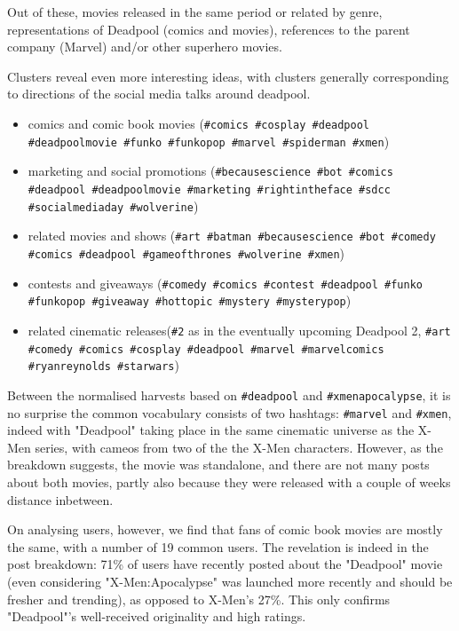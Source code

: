 \documentclass[12pt,a4paper,twoside]{report}
\begin{document}
Out of these, movies released in the same period or related by genre, representations of Deadpool (comics and movies), references to the parent company (Marvel) and/or other superhero movies.

Clusters reveal even more interesting ideas, with clusters generally corresponding to directions of the social media talks around deadpool.

\begin{itemize}
\item comics and comic book movies (\texttt{\#comics \#cosplay \#deadpool \#deadpoolmovie \#funko \#funkopop \#marvel \#spiderman \#xmen})
\item marketing and social promotions (\texttt{\#becausescience \#bot \#comics \#deadpool \#deadpoolmovie \#marketing \#rightintheface \#sdcc \#socialmediaday \#wolverine})
\item related movies and shows (\texttt{\#art \#batman \#becausescience \#bot \#comedy \#comics \#deadpool \#gameofthrones \#wolverine \#xmen})
\item contests and giveaways (\texttt{\#comedy \#comics \#contest \#deadpool \#funko \#funkopop \#giveaway \#hottopic \#mystery \#mysterypop})
\item related cinematic releases(\texttt{\#2} as in the eventually upcoming Deadpool 2, \texttt{\#art \#comedy \#comics \#cosplay \#deadpool \#marvel \#marvelcomics \#ryanreynolds \#starwars})
\end{itemize}

Between the normalised harvests based on \texttt{\#deadpool} and \texttt{\#xmenapocalypse}, it is no surprise the common vocabulary consists of two hashtags: \texttt{\#marvel} and \texttt{\#xmen}, indeed with "Deadpool" taking place in the same cinematic universe as the X-Men series, with cameos from two of the the X-Men characters. However, as the breakdown suggests, the movie was standalone, and there are not many posts about both movies, partly also because they were released with a couple of weeks distance inbetween.

On analysing users, however, we find that fans of comic book movies are mostly the same, with a number of 19 common users. The revelation is indeed in the post breakdown: 71\% of users have recently posted about the "Deadpool" movie (even considering "X-Men:Apocalypse" was launched more recently and should be fresher and trending), as opposed to X-Men's 27\%. This only confirms "Deadpool"'s well-received originality and high ratings.
\end{document}
